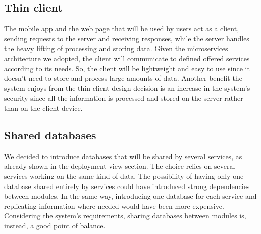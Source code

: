 \subsection{Thin client}
\label{subsec:thin_client}%
The mobile app and the web page that will be used by users act as a client, sending requests to the server and receiving responses,
while the server handles the heavy lifting of processing and storing data.
Given the microservices architecture we adopted, the client will communicate to defined offered services according to its needs.
So, the client will be lightweight and easy to use since it doesn't need to store and process large amounts of data.
Another benefit the system enjoys from the thin client design decision is an increase in the system's security
since all the information is processed and stored on the server rather than on the client device.

\subsection{Shared databases}
\label{subsec:shared_databases}%
We decided to introduce databases that will be shared by several services, as already shown in the deployment view section.
The choice relies on several services working on the same kind of data.
The possibility of having only one database shared entirely by services could have introduced strong dependencies between modules.
In the same way, introducing one database for each service and replicating information where needed would have been more expensive.
Considering the system's requirements, sharing databases between modules is, instead, a good point of balance.
